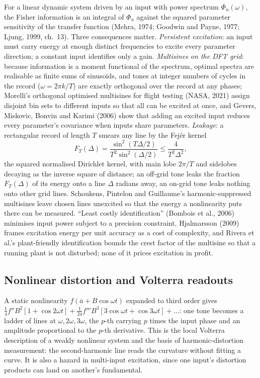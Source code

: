 For a linear dynamic system driven by an input with power spectrum $\Phi_u(\omega)$, the Fisher information is an integral of $\Phi_u$ against the squared parameter sensitivity of the transfer function (Mehra, 1974; Goodwin and Payne, 1977; Ljung, 1999, ch.\ 13). Three consequences matter. \emph{Persistent excitation}: an input must carry energy at enough distinct frequencies to excite every parameter direction; a constant input identifies only a gain. \emph{Multisines on the DFT grid}: because information is a moment functional of the spectrum, optimal spectra are realisable as finite sums of sinusoids, and tones at integer numbers of cycles in the record ($\omega = 2\pi k/T$) are exactly orthogonal over the record at any phases; Morelli's orthogonal optimised multisines for flight testing (NASA, 2021) assign disjoint bin sets to different inputs so that all can be excited at once, and Gevers, Miskovic, Bonvin and Karimi (2006) show that adding an excited input reduces every parameter's covariance when inputs share parameters. \emph{Leakage}: a rectangular record of length $T$ smears any line by the Fej\'er kernel
\begin{equation}
F_T(\Delta) = \frac{\sin^2(T\Delta/2)}{T^2\sin^2(\Delta/2)} \le \frac{4}{T^2\Delta^2},
\label{ident:eq:fejer}
\end{equation}
the squared normalised Dirichlet kernel, with main lobe $2\pi/T$ and sidelobes decaying as the inverse square of distance; an off-grid tone leaks the fraction $F_T(\Delta)$ of its energy onto a line $\Delta$ radians away, an on-grid tone leaks nothing onto other grid lines. Schoukens, Pintelon and Guillaume's harmonic-suppressed multisines leave chosen lines unexcited so that the energy a nonlinearity puts there can be measured. ``Least costly identification'' (Bombois et al., 2006) minimises input power subject to a precision constraint, Hjalmarsson (2009) frames excitation energy per unit accuracy as a cost of complexity, and Rivera et al.'s plant-friendly identification bounds the crest factor of the multisine so that a running plant is not disturbed; none of it prices excitation in profit.

\subsection{Nonlinear distortion and Volterra readouts}

A static nonlinearity $f(\bar a + B\cos\omega t)$ expanded to third order gives $\tfrac14 f''B^2[1 + \cos 2\omega t] + \tfrac1{24}f'''B^3[3\cos\omega t + \cos 3\omega t] + \ldots$: one tone becomes a ladder of lines at $\omega, 2\omega, 3\omega$, the $p$-th carrying $p$ times the input phase and an amplitude proportional to the $p$-th derivative. This is the local Volterra description of a weakly nonlinear system and the basis of harmonic-distortion measurement: the second-harmonic line reads the curvature without fitting a curve. It is also a hazard in multi-input excitation, since one input's distortion products can land on another's fundamental.

